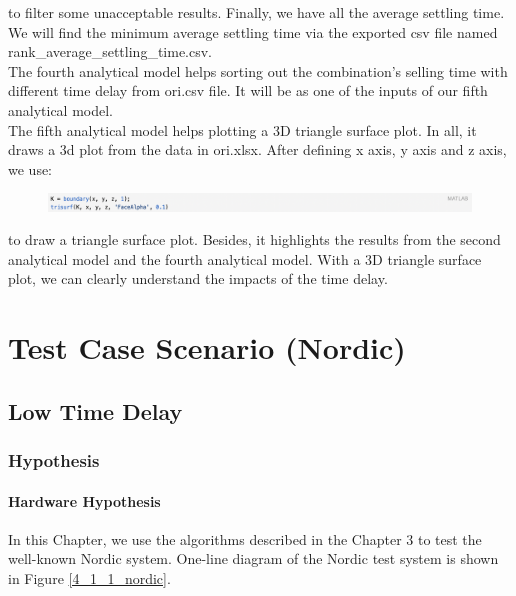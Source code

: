 \documentclass{report}
\begin{document}
to filter some unacceptable results. Finally, we have all the average settling time. We will find the minimum average settling time via the exported csv file named rank\_average\_settling\_time.csv.\\

The fourth analytical model helps sorting out the combination’s selling time with different time delay from ori.csv file. It will be as one of the inputs of our fifth analytical model.\\

The fifth analytical model helps plotting a 3D triangle surface plot. In all, it draws a 3d plot from the data in ori.xlsx. After defining x axis, y axis and z axis, we use:\\

\begin{figure}[htbp]
\centering
\includegraphics[width = .999\textwidth]{figure/3_4_2_code7.png}
\label{3_4_2_code7}
\end{figure}

to draw a triangle surface plot. Besides, it highlights the results from the second analytical model and the fourth analytical model. With a 3D triangle surface plot, we can clearly understand the impacts of the time delay.\\


\part{Test Case Scenario (Nordic) }
\chapter{Low Time Delay}
\label{Chapter4} %
\section{Hypothesis} %
\subsection{Hardware Hypothesis} %

In this Chapter, we use the algorithms described in the Chapter 3 to test the well-known Nordic system. One-line diagram of the Nordic test system is  shown in Figure \textcolor{red}{\ref{4_1_1_nordic}}.\\
\end{document}
